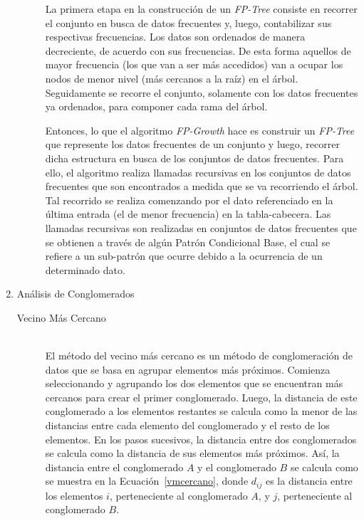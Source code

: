 \begin{enumerate}
\begin{description}
      La primera etapa en la construcción de un \textit{FP-Tree} consiste en recorrer el conjunto en busca de datos frecuentes y, luego, contabilizar sus respectivas frecuencias. Los datos son ordenados de manera decreciente, de acuerdo con sus frecuencias. De esta forma aquellos de mayor frecuencia (los que van a ser más accedidos) van a ocupar los nodos de menor nivel (más cercanos a la raíz) en el árbol. Seguidamente se recorre el conjunto, solamente con los datos frecuentes ya ordenados, para componer cada rama del árbol.
      
      Entonces, lo que el algoritmo \textit{FP-Growth} hace es construir un \textit{FP-Tree} que represente los datos frecuentes de un conjunto y luego, recorrer dicha estructura en busca de los conjuntos de datos frecuentes. Para ello, el algoritmo realiza llamadas recursivas en los conjuntos de datos frecuentes que son encontrados a medida que se va recorriendo el árbol. Tal recorrido se realiza comenzando por el dato referenciado en la última entrada (el de menor frecuencia) en la tabla-cabecera. Las llamadas recursivas son realizadas en conjuntos de datos frecuentes que se obtienen a través de algún Patrón Condicional Base, el cual se refiere a un sub-patrón que ocurre debido a la ocurrencia de un determinado dato.

    \end{description}
    
    
  \item Análisis de Conglomerados
    \begin{description}
    
      \item[Vecino Más Cercano] \hfill \\
     El método del vecino más cercano es un método de conglomeración de datos que se basa en agrupar elementos más próximos. Comienza seleccionando y agrupando los dos elementos que se encuentran más cercanos para crear el primer conglomerado. Luego, la distancia de este conglomerado a los elementos restantes se calcula como la menor de las distancias entre cada elemento del conglomerado y el resto de los elementos. En los pasos sucesivos, la distancia entre dos conglomerados se calcula como la distancia de sus elementos más próximos. Así, la distancia entre el conglomerado $A$ y el conglomerado $B$ se calcula como se muestra en la Ecuación~\ref{vmcercano}, donde $d_{ij}$ es la distancia entre los elementos $i$, perteneciente al conglomerado $A$, y $j$, perteneciente al conglomerado $B$.
     

\end{description}
\end{enumerate}
